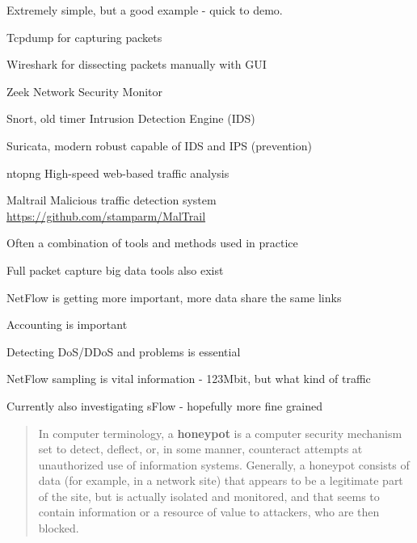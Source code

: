 \documentclass[Screen16to9,17pt]{foils}
\begin{document}
Extremely simple, but a good example - quick to demo.





\begin{list1}
\item Tcpdump for capturing packets
\item Wireshark for dissecting packets manually with GUI
\item Zeek Network Security Monitor
\item Snort, old timer Intrusion Detection Engine (IDS)
\item Suricata, modern robust capable of IDS and IPS (prevention)
\item ntopng High-speed web-based traffic analysis
\item Maltrail Malicious traffic detection system \url{https://github.com/stamparm/MalTrail}
\end{list1}

\vskip 5mm
\centerline{Often a combination of tools and methods used in practice}

Full packet capture big data tools also exist


\begin{slidelist}
\item NetFlow is getting more important, more data share the same links
\item Accounting is important
\item Detecting DoS/DDoS and problems is essential
\item NetFlow sampling is vital information - 123Mbit, but what kind of traffic
\item Currently also investigating sFlow - hopefully more fine grained
\end{slidelist}



\vskip 1cm
\begin{quote}
In computer terminology, a {\bf honeypot} is a computer security mechanism set to detect, deflect, or, in some manner, counteract attempts at unauthorized use of information systems. Generally, a honeypot consists of data (for example, in a network site) that appears to be a legitimate part of the site, but is actually isolated and monitored, and that seems to contain information or a resource of value to attackers, who are then blocked.
\end{quote}
\end{document}
